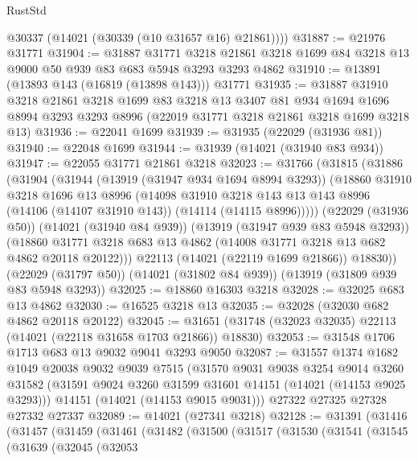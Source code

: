 \begin{lexlean}{RustStd}
\begin{coremodule}
        @30337
        (@14021 (@30339 (@10 @31657 @16) @21861))))
@31887 := @21976 @31771
@31904 := @31887
    @31771
    @3218
    @21861
    @3218
    @1699
    @84
    @3218
    @13
    @9000
    @50
    @939
    @83
    @683
    @5948
    @3293
    @3293
    @4862
@31910 := @13891 (@13893 @143 (@16819 (@13898 @143))) @31771
@31935 := @31887
    @31910
    @3218
    @21861
    @3218
    @1699
    @83
    @3218
    @13
    @3407
    @81
    @934
    @1694
    @1696
    @8994
    @3293
    @3293
    @8996
    (@22019 @31771 @3218 @21861 @3218 @1699 @3218 @13)
@31936 := @22041 @1699
@31939 := @31935 (@22029 (@31936 @81))
@31940 := @22048 @1699
@31944 := @31939 (@14021 (@31940 @83 @934))
@31947 := @22055 @31771 @21861 @3218
@32023 := @31766
    (@31815
      (@31886
        (@31904
          (@31944
            (@13919 (@31947 @934 @1694 @8994 @3293))
            (@18860
              @31910
              @3218
              @1696
              @13
              @8996
              (@14098
                @31910
                @3218
                @143
                @13
                @143
                @8996
                (@14106 (@14107 @31910 @143))
                (@14114 (@14115 @8996)))))
          (@22029 (@31936 @50))
          (@14021 (@31940 @84 @939))
          (@13919 (@31947 @939 @83 @5948 @3293))
          (@18860 @31771 @3218 @683 @13 @4862 (@14008 @31771 @3218 @13 @682 @4862 @20118 @20122)))
        @22113
        (@14021 (@22119 @1699 @21866))
        @18830))
    (@22029 (@31797 @50))
    (@14021 (@31802 @84 @939))
    (@13919 (@31809 @939 @83 @5948 @3293))
@32025 := @18860 @16303 @3218
@32028 := @32025 @683 @13 @4862
@32030 := @16525 @3218 @13
@32035 := @32028 (@32030 @682 @4862 @20118 @20122)
@32045 := @31651 (@31748 (@32023 @32035) @22113 (@14021 (@22118 @31658 @1703 @21866)) @18830)
@32053 := @31548 @1706 @1713 @683 @13 @9032 @9041 @3293 @9050
@32087 := @31557
    @1374
    @1682
    @1049
    @20038
    @9032
    @9039
    @7515
    (@31570
      @9031
      @9038
      @3254
      @9014
      @3260
      @31582
      (@31591 @9024 @3260 @31599 @31601 @14151 (@14021 (@14153 @9025 @3293)))
      @14151
      (@14021 (@14153 @9015 @9031)))
    @27322
    @27325
    @27328
    @27332
    @27337
@32089 := @14021 (@27341 @3218)
@32128 := @31391
    (@31416
      (@31457
        (@31459
          (@31461
            (@31482
              (@31500
                (@31517
                  (@31530
                    (@31541
                      (@31545
                        (@31639
                          (@32045
                            (@32053

\end{coremodule}
\end{lexlean}
